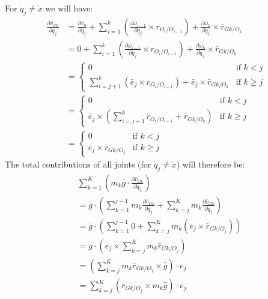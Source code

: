 \documentclass[a4paper,10pt]{article}
\begin{document}
For $\dot{q}_j \neq \dot{x}$ we will have:
\begin{align}
 \frac{\partial \bar{v}_{Gk}}{\partial \dot{q}_j} &= \frac{\partial \bar{v}_0}{\partial \dot{q}_j} + \sum\limits_{i=1}^{k} \left( \frac{\partial \bar\omega_{i-1}}{\partial \dot{q}_j} \times r_{O_{i}/O_{i-1}} \right) + \frac{\partial \bar\omega_k}{\partial \dot{q}_j} \times \bar{r}_{Gk/O_k}  \nonumber \\ 
 &= 0 + \sum\limits_{i=1}^{k} \left( \frac{\partial \bar\omega_{i-1}}{\partial \dot{q}_j} \times r_{O_{i}/O_{i-1}} \right) + \frac{\partial \bar\omega_k}{\partial \dot{q}_j} \times \bar{r}_{Gk/O_k}  \nonumber \\
 &= \begin{cases}
     0 & \mbox{if } k < j \\
     \sum\limits_{i=j+1}^{k} \left( \bar{e}_j \times r_{O_{i}/O_{i-1}} \right) + \bar{e}_j \times \bar{r}_{Gk/O_k} & \mbox{if } k \geq j
    \end{cases} \nonumber \\
 &= \begin{cases}
     0 & \mbox{if } k < j \\
     \bar{e}_j \times \left( \sum\limits_{i=j+1}^{k} \bar{r}_{O_{i}/O_{i-1}} + \bar{r}_{Gk/O_k}\right) & \mbox{if } k \geq j
    \end{cases} \nonumber \\
 &= \begin{cases}
     0 & \mbox{if } k < j \\
     \bar{e}_j \times \bar{r}_{Gk/O_j} & \mbox{if } k \geq j
    \end{cases} 
\end{align}
The total contributions of all joints (for $\dot{q}_j \neq \dot{x}$) will therefore be:
\begin{align}
 &\sum\limits_{k=1}^K \left( m_k\bar{g} \cdot \frac{\partial \bar{v}_{Gk}}{\partial \dot{q}_j} \right) \nonumber \\
 &= \bar{g} \cdot \left( \sum\limits_{k=1}^{j-1} m_k\frac{\partial \bar{v}_{Gk}}{\partial \dot{q}_j} + \sum\limits_{k=j}^{K} m_k\frac{\partial \bar{v}_{Gk}}{\partial \dot{q}_j} \right) \nonumber \\ 
 &= \bar{g} \cdot \left( \sum\limits_{k=1}^{j-1} 0 + \sum\limits_{k=j}^{K} m_k\left({e}_j \times \bar{r}_{Gk/O_j} \right) \right) \nonumber \\
 &= \bar{g} \cdot \left( {e}_j \times \sum\limits_{k=j}^{K} m_k\bar{r}_{Gk/O_j} \right) \nonumber \\
 &= \left( \sum\limits_{k=j}^{K} m_k\bar{r}_{Gk/O_j} \times \bar{g} \right) \cdot {e}_j \nonumber \\
 &= \sum\limits_{k=j}^{K} \left( \bar{r}_{Gk/O_j} \times m_k\bar{g} \right) \cdot {e}_j \label{gravity2}
\end{align}
\end{document}
